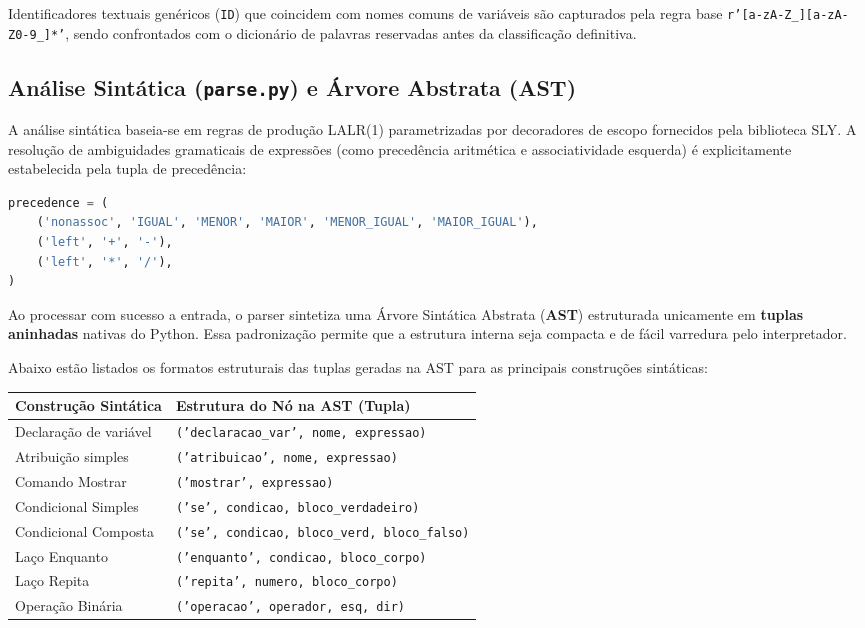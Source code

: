 \documentclass[12pt,a4paper]{article}
\begin{document}
Identificadores textuais genéricos (\texttt{ID}) que coincidem com nomes comuns de variáveis são capturados pela regra base \texttt{r'[a-zA-Z\_][a-zA-Z0-9\_]*'}, sendo confrontados com o dicionário de palavras reservadas antes da classificação definitiva.

\subsection{Análise Sintática (\texttt{parse.py}) e Árvore Abstrata (AST)}

A análise sintática baseia-se em regras de produção LALR(1) parametrizadas por decoradores de escopo fornecidos pela biblioteca SLY. A resolução de ambiguidades gramaticais de expressões (como precedência aritmética e associatividade esquerda) é explicitamente estabelecida pela tupla de precedência:

\begin{lstlisting}[language=Python, caption={Declaração de precedência estática no parser}]
precedence = (
    ('nonassoc', 'IGUAL', 'MENOR', 'MAIOR', 'MENOR_IGUAL', 'MAIOR_IGUAL'),
    ('left', '+', '-'),
    ('left', '*', '/'),
)
\end{lstlisting}

Ao processar com sucesso a entrada, o parser sintetiza uma Árvore Sintática Abstrata (\textbf{AST}) estruturada unicamente em \textbf{tuplas aninhadas} nativas do Python. Essa padronização permite que a estrutura interna seja compacta e de fácil varredura pelo interpretador.

Abaixo estão listados os formatos estruturais das tuplas geradas na AST para as principais construções sintáticas:

\begin{center}
\begin{tabular}{lp{8.5cm}}
\hline
\textbf{Construção Sintática} & \textbf{Estrutura do Nó na AST (Tupla)} \\
\hline
Declaração de variável & \texttt{('declaracao\_var', nome, expressao)} \\
Atribuição simples     & \texttt{('atribuicao', nome, expressao)} \\
Comando Mostrar        & \texttt{('mostrar', expressao)} \\
Condicional Simples    & \texttt{('se', condicao, bloco\_verdadeiro)} \\
Condicional Composta   & \texttt{('se', condicao, bloco\_verd, bloco\_falso)} \\
Laço Enquanto          & \texttt{('enquanto', condicao, bloco\_corpo)} \\
Laço Repita            & \texttt{('repita', numero, bloco\_corpo)} \\
Operação Binária       & \texttt{('operacao', operador, esq, dir)} \\
\hline
\end{tabular}
\end{center}
\end{document}
